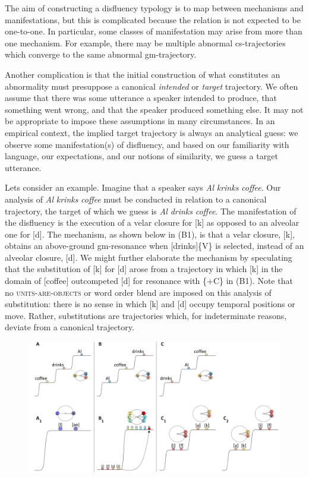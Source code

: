   The aim of constructing a disfluency typology is to map between mechanisms and manifestations, but this is complicated because the relation is not expected to be one-to-one. In particular, some classes of manifestation may arise from more than one mechanism. For example, there may be multiple abnormal cs-trajectories which converge to the same abnormal gm-trajectory. 

  Another complication is that the initial construction of what constitutes an abnormality must presuppose a canonical \textit{intended} or \textit{target} trajectory. We often assume that there was some utterance a speaker intended to produce, that something went wrong, and that the speaker produced something else. It may not be appropriate to impose these assumptions in many circumstances. In an empirical context, the implied target trajectory is always an analytical guess: we observe some manifestation(s) of disfluency, and based on our familiarity with language, our expectations, and our notions of similarity, we guess a target utterance.

  Lets consider an example. Imagine that a speaker says \textit{Al} \textit{krinks} \textit{coffee}. Our analysis of \textit{Al} \textit{krinks} \textit{coffee} must be conducted in relation to a canonical trajectory, the target of which we guess is \textit{Al} \textit{drinks} \textit{coffee}. The manifestation of the disfluency is the execution of a velar closure for [k] as opposed to an alveolar one for [d]. The mechanism, as shown below in (B1), is that a velar closure, [k], obtains an above-ground gm-resonance when [drinks]\{V\} is selected, instead of an alveolar closure, [d]. We might further elaborate the mechanism by speculating that the substitution of [k] for [d] arose from a trajectory in which [k] in the domain of [coffee] outcompeted [d] for resonance with \{+C\} in (B1). Note that no \textsc{units}\textsc{{}-are-}\textsc{objects} or word order blend are imposed on this analysis of substitution: there is no sense in which [k] and [d] occupy temporal positions or move. Rather, substitutions are trajectories which, for indeterminate reasons, deviate from a canonical trajectory. 

  
\begin{figure}
\includegraphics[width=\textwidth]{figures/Tilsen-img58.png}
\caption{\missingcaption}
\label{fig:}
\end{figure}
 


